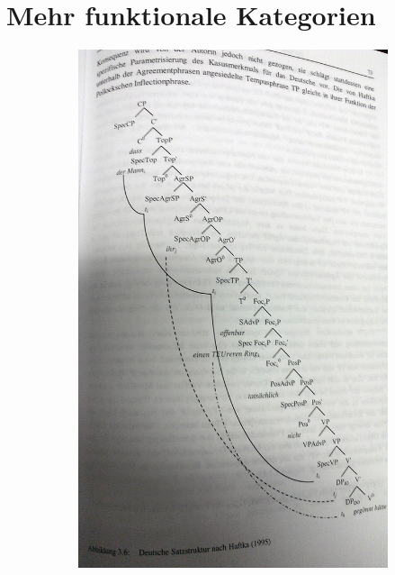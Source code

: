 \section{Mehr funktionale Kategorien}

\begin{frame}
\nocite{Lenerz93a}

\begin{figure}[b]
	\begin{minipage}[b]{0.48\textwidth}
	\begin{figure}					
		\includegraphics[scale=0.06]{material/Haftka95CP}

\end{figure}
\end{minipage}
\end{figure}
\end{frame}
